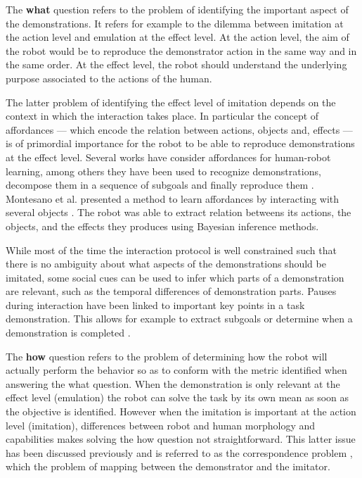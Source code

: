 The \textbf{what} question refers to the problem of identifying the important aspect of the demonstrations. It refers for example to the dilemma between imitation at the action level and emulation at the effect level. At the action level, the aim of the robot would be to reproduce the demonstrator action in the same way and in the same order. At the effect level, the robot should understand the underlying purpose associated to the actions of the human.

The latter problem of identifying the effect level of imitation depends on the context in which the interaction takes place. In particular the concept of affordances \cite{gibson1986ecological} --- which encode the relation between actions, objects and, effects --- is of primordial importance for the robot to be able to reproduce demonstrations at the effect level. Several works have consider affordances for human-robot learning, among others they have been used to recognize demonstrations, decompose them in a sequence of subgoals and finally reproduce them \cite{macl07affimit}. Montesano et al. presented a method to learn affordances by interacting with several objects \cite{montesano2008learning}. The robot was able to extract relation betweens its actions, the objects, and the effects they produces using Bayesian inference methods.

While most of the time the interaction protocol is well constrained such that there is no ambiguity about what aspects of the demonstrations should be imitated, some social cues can be used to infer which parts of a demonstration are relevant, such as the temporal differences of demonstration parts. Pauses during interaction have been linked to important key points in a task demonstration. This allows for example to extract subgoals or determine when a demonstration is completed \cite{theofilis2013temporal}.

The \textbf{how} question refers to the problem of determining how the robot will actually perform the behavior so as to conform with the metric identified when answering the what question. When the demonstration is only relevant at the effect level (emulation) the robot can solve the task by its own mean as soon as the objective is identified. However when the imitation is important at the action level (imitation), differences between robot and human morphology and capabilities makes solving the how question not straightforward. This latter issue has been discussed previously and is referred to as the correspondence problem \cite{nehaniv2002correspondence}, which the problem of mapping between the demonstrator and the imitator.

